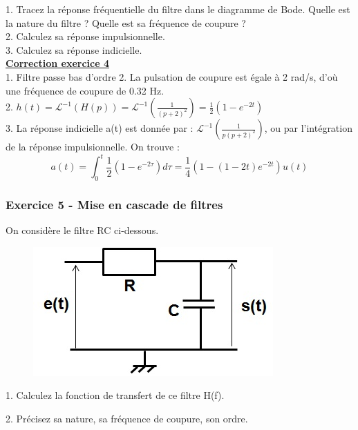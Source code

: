 \documentclass[11pt]{report}
\begin{document}
	1. Tracez la réponse fréquentielle du filtre dans le diagramme de Bode. Quelle est la nature du filtre ? Quelle est sa fréquence de coupure ? \\
	
	2. Calculez sa réponse impulsionnelle.\\
	
	3. Calculez sa réponse indicielle. \\
	
	\textbf{\underline{Correction exercice 4}}\\
	
	1. Filtre passe bas d'ordre 2. La pulsation de coupure est égale à 2 rad/s, d'où une fréquence de coupure de 0.32 Hz.\\
	
	2. $h(t)=\mathcal{L}^{-1}(H(p))=\mathcal{L}^{-1}(\frac{1}{(p+2)^2})=\frac{1}{2}(1-e^{-2t})$\\
	
	3. La réponse indicielle a(t) est donnée par : $\mathcal{L}^{-1}(\frac{1}{p(p+2)^2})$, ou par l'intégration de la réponse impulsionnelle. On trouve : 
	\begin{equation*}
	a(t)=\int_{0}^{t}\frac{1}{2}(1-e^{-2\tau})d\tau = \frac{1}{4}(1-(1-2t)e^{-2t})u(t)
	\end{equation*}
	
	
	

	
	
	\subsubsection{Exercice 5 - Mise en cascade de filtres}
	On considère le filtre RC ci-dessous.
	
	\begin{figure}[h!]
		\centering
		\includegraphics[scale=0.5]{images/Filtre_RC_passe_bas.jpg} 
	\end{figure}

	1. Calculez la fonction de transfert de ce filtre H(f).
	
	2. Précisez sa nature, sa fréquence de coupure, son ordre.
	
\end{document}
